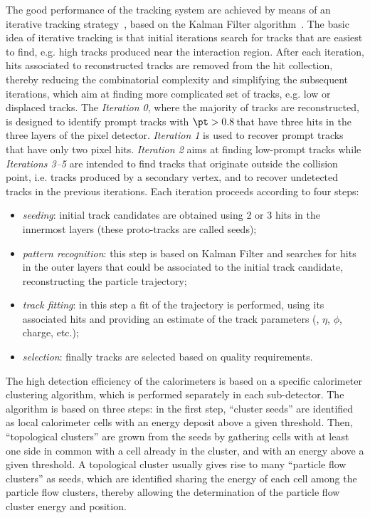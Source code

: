 The good performance of the tracking system are achieved by means of an iterative tracking strategy~\cite{Chatrchyan:2014fea}, based on the Kalman Filter algorithm~\cite{Billoir:1990we}. The basic idea of iterative tracking is that initial iterations search for tracks that are easiest to find, e.g. high \pt tracks produced near the interaction region. After each iteration, hits associated to reconstructed tracks are removed from the hit collection, thereby reducing the combinatorial complexity and simplifying the subsequent iterations, which aim at finding more complicated set of tracks, e.g. low \pt or displaced tracks. The \emph{Iteration 0}, where the majority of tracks are reconstructed, is designed to identify prompt tracks with $\pt>0.8$\,\GeV that have three hits in the three layers of the pixel detector. \emph{Iteration 1} is used to recover prompt tracks that have only two pixel hits. \emph{Iteration 2} aims at finding low-\pt prompt tracks while \emph{Iterations 3--5} are intended to find tracks that originate outside the collision point, i.e. tracks produced by a secondary vertex, and to recover undetected tracks in the previous iterations. Each iteration proceeds according to four steps:
\begin{itemize}
\item \emph{seeding}: initial track candidates are obtained using 2 or 3 hits in the innermost layers (these proto-tracks are called seeds);
\item \emph{pattern recognition}: this step is based on Kalman Filter and searches for hits in the outer layers that could be associated to the initial track candidate, reconstructing the particle trajectory;
\item \emph{track fitting}: in this step a fit of the trajectory is performed, using its associated hits and providing an estimate of the track parameters (\pt, $\eta$, $\phi$, charge, etc.);
\item \emph{selection}: finally tracks are selected based on quality requirements.
\end{itemize}

The high detection efficiency of the calorimeters is based on a specific calorimeter clustering algorithm, which is performed separately in each sub-detector. The algorithm is based on three steps: in the first step, ``cluster seeds'' are identified as local calorimeter cells with an energy deposit above a given threshold. Then, ``topological clusters'' are grown from the seeds by gathering cells with at least one side in common with a cell already in the cluster, and with an energy above a given threshold. A topological cluster usually gives rise to many ``particle flow clusters'' as seeds, which are identified sharing the energy of each cell among the particle flow clusters, thereby allowing the determination of the particle flow cluster energy and position.

